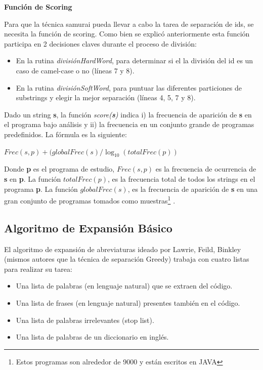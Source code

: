 \documentclass[a4paper,12pt]{report}
\begin{document}
\pagebreak
\noindent \textbf{Función de Scoring}

Para que la técnica samurai pueda llevar a cabo la tarea de separación de ids, se necesita la función de scoring. Como bien se explicó anteriormente esta función participa en 2 decisiones claves durante el proceso de división:

\begin{itemize}
\itemsep0em%
\item En la rutina \textit{divisiónHardWord}, para determinar si el la división del id es un caso de camel-case o no (líneas 7 y 8).

\item En la rutina \textit{divisiónSoftWord}, para puntuar las diferentes particiones de substrings y elegir la mejor separación (líneas 4, 5, 7 y 8).
\end{itemize}

Dado un string \textbf{s}, la función \textit{score(\textbf{s})} indica i) la frecuencia de aparición de \textbf{s} en el programa bajo análisis y ii) la frecuencia en un conjunto grande de programas predefinidos. La fórmula es la siguiente:

\begin{center}
$Frec(s,p) + ( globalFrec(s) / \log_{10}(totalFrec(p) )$
\end{center}

Donde \textbf{p} es el programa de estudio, $Frec(s,p)$ es la frecuencia de ocurrencia de \textbf{s} en \textbf{p}. La función $totalFrec(p)$, es la frecuencia total de todos los strings en el programa \textbf{p}. La función $globalFrec(s)$, es la frecuencia de aparición de \textbf{s} en una gran conjunto de programas tomados como muestras\footnote[1]{Estos programas son alrededor de 9000 y están escritos en JAVA} \cite{EHPV09}.

\pagebreak
\subsection{Algoritmo de Expansión Básico}
\label{sec:algExpBas}

El algoritmo de expansión de abreviaturas ideado por Lawrie, Feild, Binkley (mismos autores que la técnica de separación Greedy) \cite{LFBEX07} trabaja con cuatro listas para realizar su tarea:

\begin{itemize}
\itemsep0em%
\item Una lista de palabras (en lenguaje natural) que se extraen del código.
\item Una lista de frases (en lenguaje natural) presentes también en el código.
\item Una lista de palabras irrelevantes (stop list).
\item Una lista de palabras de un diccionario en inglés.
\end{itemize}
\end{document}
